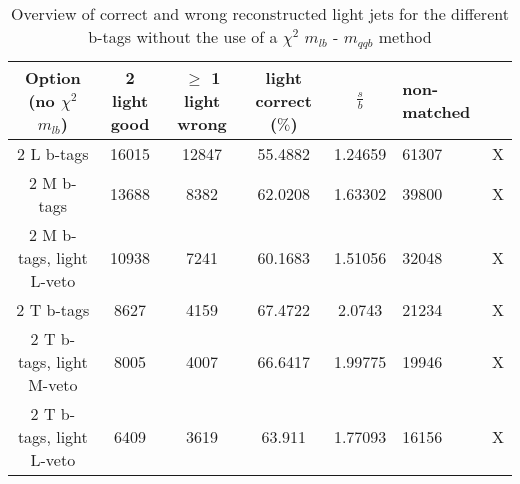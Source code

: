  \begin{table}[!h] 
 \begin{tabular}{c|c|c|c|c} 
\textbf{Option} (no $\chi^{2}$ $m_{lb}$) & 2 light good  & $\geq$ 1 light wrong & light correct ($\%$) & $\frac{s}{b}$ & non-matched \\  L b-tags              & 16015 & 12847 & 55.4882 & 1.24659 & 61307 & X \\ 
2 M b-tags              & 13688 & 8382 & 62.0208 & 1.63302 & 39800 & X \\ 
2 M b-tags, light L-veto & 10938 & 7241 & 60.1683 & 1.51056 & 32048 & X \\ 
2 T b-tags              & 8627 & 4159 & 67.4722 & 2.0743 & 21234 & X \\ 
2 T b-tags, light M-veto & 8005 & 4007 & 66.6417 & 1.99775 & 19946 & X \\ 
2 T b-tags, light L-veto & 6409 & 3619 & 63.911 & 1.77093 & 16156 & X \\ 
 \end{tabular} 
\caption{Overview of correct and wrong reconstructed light jets for the different b-tags without the use of a $\chi^{2}$ $m_{lb}$ - $m_{qqb}$ method} 
 \end{table} 
 
